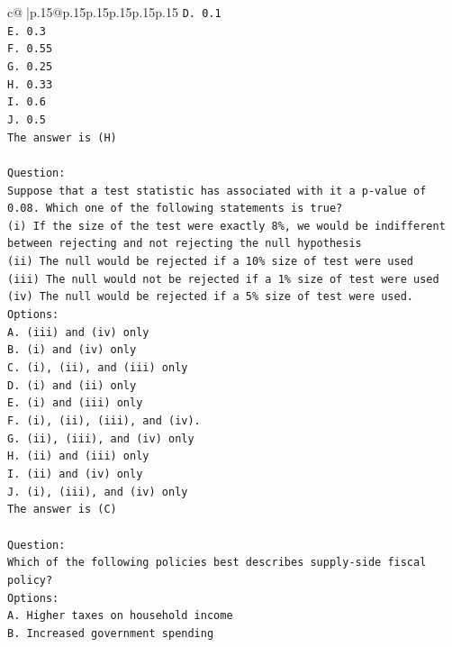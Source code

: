 \documentclass{article}
\begin{document}
{\begin{supertabular}{c@{$\;$}|p{.15\linewidth}@{}p{.15\linewidth}p{.15\linewidth}p{.15\linewidth}p{.15\linewidth}p{.15\linewidth}}
{{{\texttt{D. 0.1} \\
\texttt{E. 0.3} \\
\texttt{F. 0.55} \\
\texttt{G. 0.25} \\
\texttt{H. 0.33} \\
\texttt{I. 0.6} \\
\texttt{J. 0.5} \\
\texttt{The answer is (H)} \\
\\ 
\texttt{Question:} \\
\texttt{Suppose that a test statistic has associated with it a p{-}value of 0.08. Which one of the following statements is true?} \\
\texttt{(i) If the size of the test were exactly 8\%, we would be indifferent between rejecting and not rejecting the null hypothesis} \\
\texttt{(ii) The null would be rejected if a 10\% size of test were used} \\
\texttt{(iii) The null would not be rejected if a 1\% size of test were used} \\
\texttt{(iv) The null would be rejected if a 5\% size of test were used.} \\
\texttt{Options:} \\
\texttt{A. (iii) and (iv) only} \\
\texttt{B. (i) and (iv) only} \\
\texttt{C. (i), (ii), and (iii) only} \\
\texttt{D. (i) and (ii) only} \\
\texttt{E. (i) and (iii) only} \\
\texttt{F. (i), (ii), (iii), and (iv).} \\
\texttt{G. (ii), (iii), and (iv) only} \\
\texttt{H. (ii) and (iii) only} \\
\texttt{I. (ii) and (iv) only} \\
\texttt{J. (i), (iii), and (iv) only} \\
\texttt{The answer is (C)} \\
\\ 
\texttt{Question:} \\
\texttt{Which of the following policies best describes supply{-}side fiscal policy?} \\
\texttt{Options:} \\
\texttt{A. Higher taxes on household income} \\
\texttt{B. Increased government spending} \\
}}}
\end{supertabular}}
\end{document}
